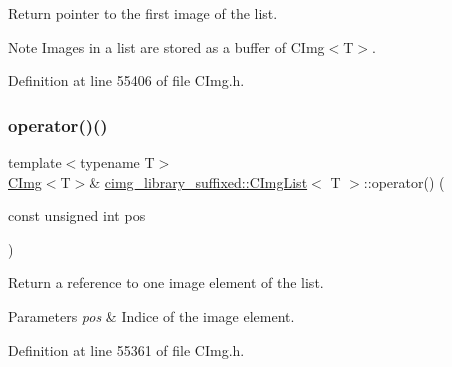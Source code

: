 Return pointer to the first image of the list. 

\begin{DoxyNote}{Note}
Images in a list are stored as a buffer of {\ttfamily C\+Img$<$\+T$>$}. 
\end{DoxyNote}


Definition at line 55406 of file C\+Img.\+h.

\mbox{\label{structcimg__library__suffixed_1_1CImgList_acb8186979d4d596cd69d2abda059a23d}} 
\subsubsection{\texorpdfstring{operator()()}{operator()()}\hspace{0.1cm}{\footnotesize\ttfamily [1/3]}}
{\footnotesize\ttfamily template$<$typename T$>$ \\
\hyperlink{structcimg__library__suffixed_1_1CImg}{C\+Img}$<$T$>$\& \hyperlink{structcimg__library__suffixed_1_1CImgList}{cimg\+\_\+library\+\_\+suffixed\+::\+C\+Img\+List}$<$ T $>$\+::operator() (\begin{DoxyParamCaption}\item[{const unsigned int}]{pos }\end{DoxyParamCaption})\hspace{0.3cm}{\ttfamily [inline]}}



Return a reference to one image element of the list. 


\begin{DoxyParams}{Parameters}
{\em pos} & Indice of the image element. \\
\hline
\end{DoxyParams}


Definition at line 55361 of file C\+Img.\+h.

\mbox{\label{structcimg__library__suffixed_1_1CImgList_a63cea4a181ea0dc5cef0e9c382745b3a}} 
